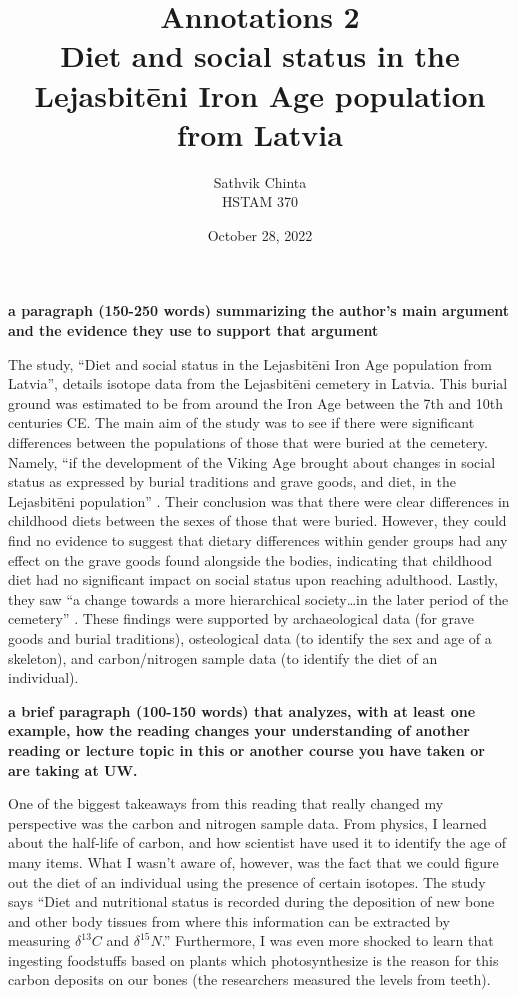\documentclass[a4paper]{article}
\title {
	Annotations 2\\ Diet and social status in the Lejasbitēni Iron Age population from Latvia
}
\author {
	\normalsize Sathvik Chinta\\\normalsize
    \normalsize HSTAM 370\\\normalsize
}
\date {
	\color{black} October 28, 2022
}
\begin{document}
 \maketitle

        \textbf{a paragraph (150-250 words) summarizing the author's main argument and the evidence they use to support that argument}
        
        The study, “Diet and social status in the Lejasbitēni Iron Age population from Latvia”, details isotope data from the 
        Lejasbitēni cemetery in Latvia. This burial ground was estimated to be from around the Iron Age between the 7th and 10th
        centuries CE. The main aim of the study was to see if there were significant differences between the populations of those
        that were buried at the cemetery. Namely, “if the development of the Viking Age brought about changes in social status as
        expressed by burial traditions and grave goods, and diet, in the Lejasbitēni population” \citep{PETERSONEGORDINA2022103519}. Their conclusion was that there 
        were clear differences in childhood diets between the sexes of those that were buried. However, they could find no 
        evidence to suggest that dietary differences within gender groups had any effect on the grave goods found alongside 
        the bodies, indicating that childhood diet had no significant impact on social status upon reaching adulthood. 
        Lastly, they saw “a change towards a more hierarchical society…in the later period of the cemetery” \citep{PETERSONEGORDINA2022103519}. 
        These findings were supported by archaeological data (for grave goods and burial traditions), 
        osteological data (to identify the sex and age of a skeleton), and carbon/nitrogen sample data 
        (to identify the diet of an individual). 

        \textbf{a brief paragraph (100-150 words) that analyzes, with at least one example, how the reading changes your understanding of another reading or lecture topic in this or another course you have taken or are taking at UW.}

        One of the biggest takeaways from this reading that really changed my perspective was the carbon and nitrogen sample data. 
        From physics, I learned about the half-life of carbon, and how scientist have used it to identify the age of many items. 
        What I wasn't aware of, however, was the fact that we could figure out the diet of an individual using the presence of 
        certain isotopes. The study says “Diet and nutritional status is recorded during the deposition of new bone and 
        other body tissues from where this information can be extracted by measuring $\delta^{13}C$ and 
        $\delta^{15}N$.”\citep{PETERSONEGORDINA2022103519} Furthermore, I was even more shocked to learn that ingesting foodstuffs based on 
        plants which photosynthesize is the reason for this carbon deposits on our bones (the researchers measured 
        the levels from teeth). 

        \pagebreak
        
        
        \cite{PETERSONEGORDINA2022103519}
\end{document}
